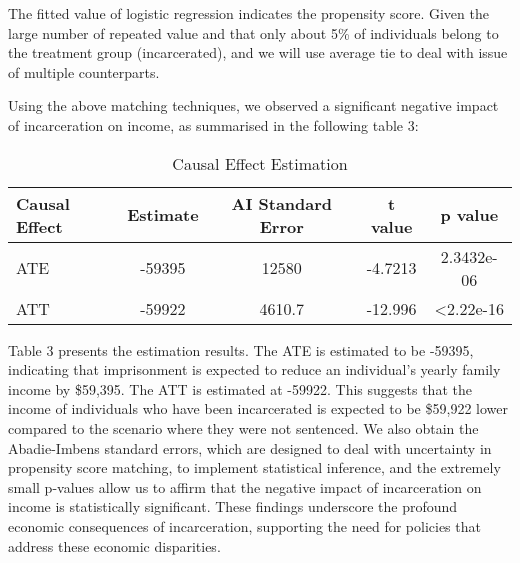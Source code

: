 \documentclass{article}[12pt]
\begin{document}
The fitted value of logistic regression indicates the propensity score. Given the large number of repeated value and that only about 5\% of individuals belong to the treatment group (incarcerated), and we will use average tie to deal with issue of multiple counterparts.

 \par
Using the above matching techniques, we observed a significant negative impact of incarceration on income, as summarised in the following table 3:
\par
\begin{table}[htbp]
    \centering
    \caption{Causal Effect Estimation}
    \label{tab: Causal Effect Estimation}
    \begin{tabular}{lcccc}
        \toprule
         \textbf{Causal Effect} & \textbf{Estimate} & \textbf{AI Standard Error} & \textbf{t value} & \textbf{p value} \\ 
        \midrule
         ATE & -59395 & 12580 & -4.7213 & 2.3432e-06  \\
         ATT & -59922 & 4610.7 & -12.996 & \textless 2.22e-16 \\
        \bottomrule
    \end{tabular}
\end{table}
Table 3 presents the estimation results. The ATE is estimated to be -59395, indicating that imprisonment is expected to reduce an individual’s yearly family income by \$59,395. The ATT is estimated at -59922. This suggests that the income of individuals who have been incarcerated is expected to be \$59,922 lower compared to the scenario where they were not sentenced. We also obtain the Abadie-Imbens standard errors, which are designed to deal with uncertainty in propensity score matching, to implement statistical inference, and the extremely small p-values allow us to affirm that the negative impact of incarceration on income is statistically significant. These findings underscore the profound economic consequences of incarceration, supporting the need for policies that address these economic disparities. \par
\end{document}
